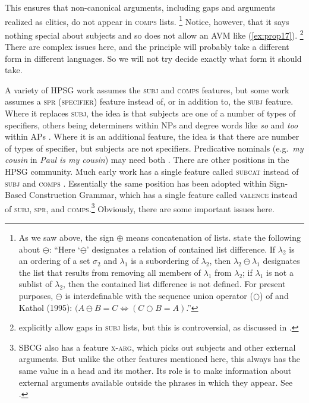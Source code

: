 \documentclass[output=paper
	        ,collection
	        ,collectionchapter
 	        ,biblatex
                ,babelshorthands
                ,newtxmath
                ,draftmode
                ,colorlinks, citecolor=brown
]{langscibook}
\begin{document}
\noindent
This ensures that non-canonical arguments, including gaps and arguments realized as clitics, do not appear in \textsc{comps} lists.%
%
\footnote{As we saw above, the sign $\oplus$ means concatenation of lists. \citet[]{GSag2000a-u} state the
  following about $\ominus$: ``Here `$\ominus$' designates a relation of contained list difference. If
$\lambda_2$ is an ordering of a set $\sigma_2$ and $\lambda_1$ is a subordering of $\lambda_2$, then
$\lambda_2 \ominus \lambda_1$ designates the list that results from removing all members of
$\lambda_1$ from $\lambda_2$; if $\lambda_1$ is not a sublist of $\lambda_2$, then the contained
list difference is not defined. For present purposes, $\ominus$ is interdefinable with the sequence
union operator ($\bigcirc$) of \citet{Reape94a} and Kathol (1995): $(A \ominus B = C
\Leftrightarrow (C \bigcirc B = A)$.''}
%
Notice, however, that it says nothing special about subjects and so does not allow an AVM like (\ref{ex:prop17}).%
%
\footnote{\citet[177--183]{GSag2000a-u} explicitly allow gaps in \textsc{subj} lists, but this is
  controversial, as discussed in \crossrefchapterw[\page
  \pageref{udc:page-subject-gaps-start}--\pageref{udc:page-subject-gaps-end}]{udc}.}
%
There are complex issues here, and the principle will probably take a different form in different languages. So we will not try decide exactly what form it should take.

A variety of HPSG work assumes the \textsc{subj} and \textsc{comps} features, but some work assumes
a \textsc{spr (specifier)} feature instead of, or in addition to, the \textsc{subj} feature. Where it
replaces \textsc{subj}, the idea is that subjects are one of a number of types of specifiers, others
being determiners within NPs and degree words like \emph{so} and \emph{too} within APs
\citep[]{ps2}. Where it is an additional feature, the idea is that there are number of
types of specifier, but subjects are not specifiers. Predicative nominals (e.g.\ \emph{my cousin} in
\emph{Paul is my cousin}) may need both
\parencites[Section~9.4.1]{ps2}[409]{GSag2000a-u}{AG2003b-u}. There are other positions in the HPSG 
community. Much early work has a single feature called \textsc{subcat}
instead of \textsc{subj} and \textsc{comps} \citep{ps}. Essentially the same position has been
adopted within Sign-Based Construction Grammar, which has a single feature called \textsc{valence}
instead of \textsc{subj}, \textsc{spr}, and \textsc{comps}.\footnote{%
  SBCG also has a feature \textsc{x-arg}, which picks out subjects and other external arguments. But
  unlike the other features mentioned here, this always has the same value in a head and its
  mother. Its role is to make information about external arguments available outside the phrases in
  which they appear.  See \citet[84, 149--151]{Sag2007a,Sag2012a}.} 
%
Obviously, there are some important issues here.
\end{document}
